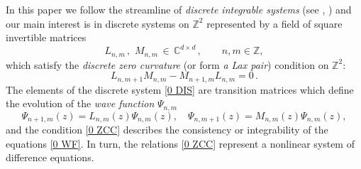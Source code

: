 \documentclass{amsart}
\theoremstyle{remark}
\numberwithin{equation}{section}
\begin{document}
In this paper we follow the streamline of \textit{discrete integrable systems} (see \cite{B2004}, \cite{BS2002}) and our main interest is in discrete systems on ${{\mathbb Z}}^2$ represented by a field of square  invertible  matrices
\begin{equation}\label{0 DIS}
L_{n,m}\,, \,\, M_{n,m}\,\in \,{{\mathbb C}}^{d\times d}\, , \qquad n,m\in{{\mathbb Z}},
\end{equation}
which satisfy the \textit{discrete zero curvature} (or form \textit{a Lax pair}) condition on ${{\mathbb Z}}^2$:
\begin{equation}\label{0 ZCC}
L_{n,m+1}M_{n,m}-M_{n+1,m}L_{n,m}=0\,.
\end{equation}
The elements of the discrete system \eqref{0 DIS} are transition matrices which define the evolution of the \textit{wave function} $\Psi_{n,m}$
\begin{equation}\label{0 WF}
\Psi_{n+1,m}(z)=L_{n,m}(z)\Psi_{n,m}(z), \quad \Psi_{n,m+1}(z)=M_{n,m}(z)\Psi_{n,m}(z),
\end{equation}
and the condition \eqref{0 ZCC} describes the consistency or integrability of the equations  \eqref{0 WF}. In turn, the relations \eqref{0 ZCC} represent a nonlinear system of difference equations.
\end{document}
